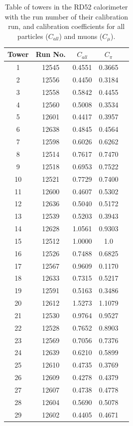 \begin{table}[hp]
\centering
	\begin{tabular}{ c c c c c}
	\hline \hline
	\textbf{Tower} & \textbf{Run No.} & $C_{all}$ & $C_{\pi}$ \\ \hline
	 1 & 12545 & 0.4551 & 0.3665 \\
	 2 & 12556 & 0.4450 & 0.3184 \\
	 3 & 12558 & 0.5842 & 0.4455 \\
	 4 & 12560 & 0.5008 & 0.3534 \\
	 5 & 12601 & 0.4417 & 0.3957 \\
	 6 & 12638 & 0.4845 & 0.4564 \\
	 7 & 12598 & 0.6026 & 0.6262 \\
	 8 & 12514 & 0.7617 & 0.7470 \\
	 9 & 12518 & 0.6953 & 0.7522 \\
	10 & 12521 & 0.7729 & 0.7400 \\
	11 & 12600 & 0.4607 & 0.5302 \\
	12 & 12636 & 0.5040 & 0.5172 \\
	13 & 12539 & 0.5203 & 0.3943 \\
	14 & 12628 & 1.0561 & 0.9303 \\
	15 & 12512 & 1.0000 & 1.0 \\
	16 & 12526 & 0.7488 & 0.6825 \\
	17 & 12567 & 0.9609 & 0.1170 \\
	18 & 12633 & 0.7315 & 0.5217 \\
	19 & 12591 & 0.5163 & 0.3486 \\
	20 & 12612 & 1.5273 & 1.1079 \\
	21 & 12530 & 0.9764 & 0.9527 \\
	22 & 12528 & 0.7652 & 0.8903 \\
	23 & 12569 & 0.7056 & 0.7376 \\
	24 & 12639 & 0.6210 & 0.5899 \\
	25 & 12610 & 0.4735 & 0.3769 \\
	26 & 12609 & 0.4278 & 0.4379 \\
	27 & 12607 & 0.4738 & 0.4778 \\
	28 & 12604 & 0.5690 & 0.5078 \\
	29 & 12602 & 0.4405 & 0.4671 \\ \hline \hline
	\end{tabular}
	\caption{Table of towers in the RD52 calorimeter with the run number of their calibration run, and calibration coefficients for all particles ($C_{all}$) and muons ($C_{\mu}$).}
	\label{table:idea/calibrationruns}
\end{table}

